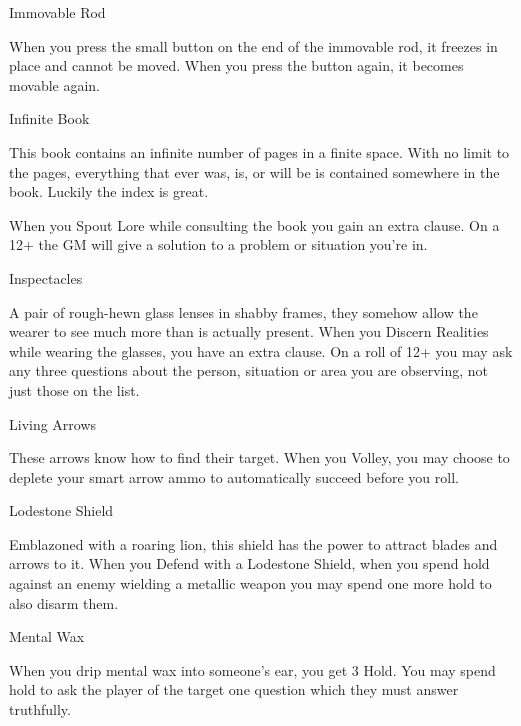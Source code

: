        

Immovable Rod	 

       

When you press the small button on the end of the immovable rod, it freezes in place and cannot be moved. When you press the button again, it becomes movable again.

       

Infinite Book	 

       

This book contains an infinite number of pages in a finite space. With no limit to the pages, everything that ever was, is, or will be is contained somewhere in the book. Luckily the index is great.

       

When you Spout Lore while consulting the book you gain an extra clause. On a 12+ the GM will give a solution to a problem or situation you're in.

       

Inspectacles	 

       

A pair of rough-hewn glass lenses in shabby frames, they somehow allow the wearer to see much more than is actually present. When you Discern Realities while wearing the glasses, you have an extra clause. On a roll of 12+ you may ask any three questions about the person, situation or area you are observing, not just those on the list.

       

Living Arrows	 

       

These arrows know how to find their target. When you Volley, you may choose to deplete your smart arrow ammo to automatically succeed before you roll.

       

Lodestone Shield	 

       

Emblazoned with a roaring lion, this shield has the power to attract blades and arrows to it. When you Defend with a Lodestone Shield, when you spend hold against an enemy wielding a metallic weapon you may spend one more hold to also disarm them.

       

Mental Wax	 

       

When you drip mental wax into someone's ear, you get 3 Hold. You may spend hold to ask the player of the target one question which they must answer truthfully.

